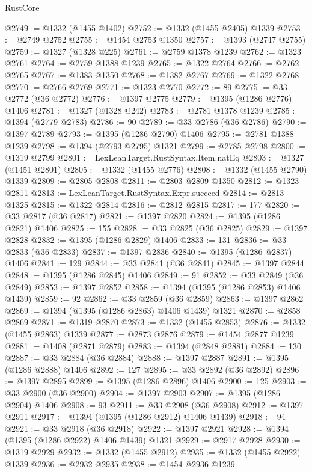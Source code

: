 \begin{lexlean}{RustCore}
\begin{coremodule}
@2749 := @1332 (@1455 @1402)
@2752 := @1332 (@1455 @2405) @1339
@2753 := @2749 @2752
@2755 := @1454 @2753 @1350
@2757 := @1393 (@2747 @2755)
@2759 := @1327 (@1328 @225)
@2761 := @2759 @1378 @1239
@2762 := @1323 @2761
@2764 := @2759 @1388 @1239
@2765 := @1322 @2764
@2766 := @2762 @2765
@2767 := @1383 @1350
@2768 := @1382 @2767
@2769 := @1322 @2768
@2770 := @2766 @2769
@2771 := @1323 @2770
@2772 := 89
@2775 := @33 @2772 (@36 @2772)
@2776 := @1397 @2775
@2779 := @1395 (@1286 @2776) @1406
@2781 := @1327 (@1328 @242)
@2783 := @2781 @1378 @1239
@2785 := @1394 (@2779 @2783)
@2786 := 90
@2789 := @33 @2786 (@36 @2786)
@2790 := @1397 @2789
@2793 := @1395 (@1286 @2790) @1406
@2795 := @2781 @1388 @1239
@2798 := @1394 (@2793 @2795) @1321
@2799 := @2785 @2798
@2800 := @1319 @2799
@2801 := LexLeanTarget.RustSyntax.Item.natEq
@2803 := @1327 (@1451 @2801)
@2805 := @1332 (@1455 @2776)
@2808 := @1332 (@1455 @2790) @1339
@2809 := @2805 @2808
@2811 := @2803 @2809 @1350
@2812 := @1323 @2811
@2813 := LexLeanTarget.RustSyntax.Expr.succeed
@2814 := @2813 @1325
@2815 := @1322 @2814
@2816 := @2812 @2815
@2817 := 177
@2820 := @33 @2817 (@36 @2817)
@2821 := @1397 @2820
@2824 := @1395 (@1286 @2821) @1406
@2825 := 155
@2828 := @33 @2825 (@36 @2825)
@2829 := @1397 @2828
@2832 := @1395 (@1286 @2829) @1406
@2833 := 131
@2836 := @33 @2833 (@36 @2833)
@2837 := @1397 @2836
@2840 := @1395 (@1286 @2837) @1406
@2841 := 129
@2844 := @33 @2841 (@36 @2841)
@2845 := @1397 @2844
@2848 := @1395 (@1286 @2845) @1406
@2849 := 91
@2852 := @33 @2849 (@36 @2849)
@2853 := @1397 @2852
@2858 := @1394 (@1395 (@1286 @2853) @1406 @1439)
@2859 := 92
@2862 := @33 @2859 (@36 @2859)
@2863 := @1397 @2862
@2869 := @1394 (@1395 (@1286 @2863) @1406 @1439) @1321
@2870 := @2858 @2869
@2871 := @1319 @2870
@2873 := @1332 (@1455 @2853)
@2876 := @1332 (@1455 @2863) @1339
@2877 := @2873 @2876
@2879 := @1454 @2877 @1239
@2881 := @1408 (@2871 @2879)
@2883 := @1394 (@2848 @2881)
@2884 := 130
@2887 := @33 @2884 (@36 @2884)
@2888 := @1397 @2887
@2891 := @1395 (@1286 @2888) @1406
@2892 := 127
@2895 := @33 @2892 (@36 @2892)
@2896 := @1397 @2895
@2899 := @1395 (@1286 @2896) @1406
@2900 := 125
@2903 := @33 @2900 (@36 @2900)
@2904 := @1397 @2903
@2907 := @1395 (@1286 @2904) @1406
@2908 := 93
@2911 := @33 @2908 (@36 @2908)
@2912 := @1397 @2911
@2917 := @1394 (@1395 (@1286 @2912) @1406 @1439)
@2918 := 94
@2921 := @33 @2918 (@36 @2918)
@2922 := @1397 @2921
@2928 := @1394 (@1395 (@1286 @2922) @1406 @1439) @1321
@2929 := @2917 @2928
@2930 := @1319 @2929
@2932 := @1332 (@1455 @2912)
@2935 := @1332 (@1455 @2922) @1339
@2936 := @2932 @2935
@2938 := @1454 @2936 @1239

\end{coremodule}
\end{lexlean}

